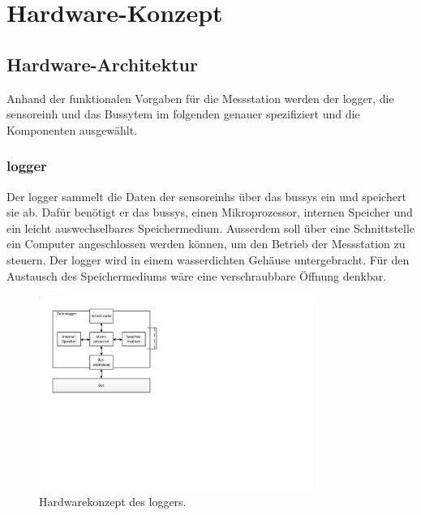 %
%

\chapter{Hardware-Konzept}\label{chap.hardware}



\section{Hardware-Architektur}\label{sec.hw_arch}

Anhand der funktionalen Vorgaben für die Messstation werden der \gls{logger}, die \gls{sensoreinh} und das Bussytem im folgenden genauer spezifiziert und die Komponenten ausgewählt.

\subsection{\gls{logger}}
Der \gls{logger} sammelt die Daten der \glspl{sensoreinh} über das \gls{bussys} ein und speichert sie ab. Dafür benötigt er das \gls{bussys}, einen Mikroprozessor, internen Speicher und ein leicht auswechselbares Speichermedium. Ausserdem soll über eine Schnittstelle ein Computer angeschlossen werden können, um den Betrieb der Messstation zu steuern. Der \gls{logger} wird in einem wasserdichten Gehäuse untergebracht. Für den Austausch des Speichermediums wäre eine verschraubbare Öffnung denkbar.

\begin{figure}[H]
	\centering
		\includegraphics[width=0.8\textwidth]{images/visio/hardwarekonzept_logger.pdf}
	\caption{Hardwarekonzept des \gls{logger}s.}
	\label{fig.hwkonzept_logger}
\end{figure}

